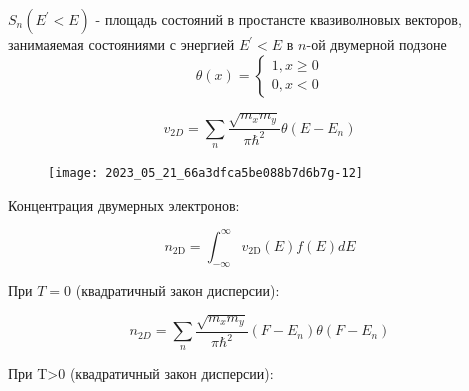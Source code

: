 $S_{n}\left(E^{\prime}<E\right)$ - площадь состояний в простансте квазиволновых векторов, занимаяемая состояниями с энергией $E^{\prime}<E$ в $n$-ой двумерной подзоне
$$
\theta(x)=\left\{\begin{array}{l}
1, x \geq 0 \\
0, x<0
\end{array}\right.
$$

$$
v_{2 D}=\sum_{n} \frac{\sqrt{m_{x} m_{y}}}{\pi \hbar^{2}} \theta\left(E-E_{n}\right)
$$
\begin{figure} [h!]
    \centering
    \texttt{[image: 2023\_05\_21\_66a3dfca5be088b7d6b7g-12]}
\end{figure}


Концентрация двумерных электронов:

$$
n_{2 \mathrm{D}}=\int_{-\infty}^{\infty} v_{2 \mathrm{D}}(E) f(E) d E
$$

При $T=0$ (квадратичный закон дисперсии):

$$
n_{2 D}=\sum_{n} \frac{\sqrt{m_{x} m_{y}}}{\pi \hbar^{2}}\left(F-E_{n}\right) \theta\left(F-E_{n}\right)
$$

При T>0 (квадратичный закон дисперсии):

